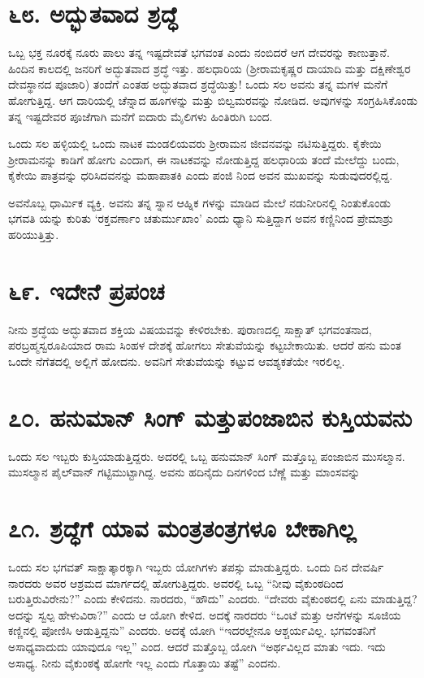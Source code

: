 \section{\num{೬೮. } ಅದ್ಭುತವಾದ ಶ್ರದ್ಧೆ}

ಒಬ್ಬ ಭಕ್ತ ನೂರಕ್ಕೆ ನೂರು ಪಾಲು ತನ್ನ ಇಷ್ಟದೇವತೆ ಭಗವಂತ ಎಂದು ನಂಬಿದರೆ ಆಗ ದೇವರನ್ನು ಕಾಣುತ್ತಾನೆ. ಹಿಂದಿನ ಕಾಲದಲ್ಲಿ ಜನರಿಗೆ ಅದ್ಭುತವಾದ ಶ್ರದ್ಧೆ ಇತ್ತು. ಹಲಧಾರಿಯ (ಶ್ರೀರಾಮಕೃಷ್ಣರ ದಾಯಾದಿ ಮತ್ತು ದಕ್ಷಿಣೇಶ್ವರ ದೇವಸ್ಥಾನದ ಪೂಜಾರಿ) ತಂದೆಗೆ ಎಂತಹ ಅದ್ಭುತವಾದ ಶ್ರದ್ಧೆಯಿತ್ತು! ಒಂದು ಸಲ ಅವನು ತನ್ನ ಮಗಳ ಮನೆಗೆ ಹೋಗುತ್ತಿದ್ದ. ಆಗ ದಾರಿಯಲ್ಲಿ ಚೆನ್ನಾದ ಹೂಗಳನ್ನು ಮತ್ತು ಬಿಲ್ವಮರವನ್ನು ನೋಡಿದ. ಅವುಗಳನ್ನು ಸಂಗ್ರಹಿಸಿಕೊಂಡು ತನ್ನ ಇಷ್ಟದೇವರ ಪೂಜೆಗಾಗಿ ಮನೆಗೆ ಐದಾರು ಮೈಲಿಗಳು ಹಿಂತಿರುಗಿ ಬಂದ.

ಒಂದು ಸಲ ಹಳ್ಳಿಯಲ್ಲಿ ಒಂದು ನಾಟಕ ಮಂಡಲಿಯವರು ಶ್ರೀರಾಮನ ಜೀವನವನ್ನು ನಟಿಸುತ್ತಿದ್ದರು. ಕೈಕೇಯಿ ಶ್ರೀರಾಮನನ್ನು ಕಾಡಿಗೆ ಹೋಗು ಎಂದಾಗ, ಈ ನಾಟಕವನ್ನು ನೋಡುತ್ತಿದ್ದ ಹಲಧಾರಿಯ ತಂದೆ ಮೇಲೆದ್ದು ಬಂದು, ಕೈಕೇಯಿ ಪಾತ್ರವನ್ನು ಧರಿಸಿದವನನ್ನು ಮಹಾಪಾತಕಿ ಎಂದು ಪಂಜಿ ನಿಂದ ಅವನ ಮುಖವನ್ನು ಸುಡುವುದರಲ್ಲಿದ್ದ.

ಅವನೊಬ್ಬ ಧಾರ್ಮಿಕ ವ್ಯಕ್ತಿ. ಅವನು ತನ್ನ ಸ್ನಾನ ಆಹ್ನಿಕ ಗಳನ್ನು ಮಾಡಿದ ಮೇಲೆ ನಡುನೀರಿನಲ್ಲಿ ನಿಂತುಕೊಂಡು ಭಗವತಿ ಯನ್ನು ಕುರಿತು ‘ರಕ್ತವರ್ಣಾಂ ಚತುರ್ಮುಖಾಂ’ ಎಂದು ಧ್ಯಾನಿ ಸುತ್ತಿದ್ದಾಗ ಅವನ ಕಣ್ಣಿನಿಂದ ಪ್ರೇಮಾಶ್ರು ಹರಿಯುತ್ತಿತ್ತು.


\section{\num{೬೯.} ಇದೇನೆ ಪ್ರಪಂಚ }

ನೀನು ಶ್ರದ್ಧೆಯ ಅದ್ಭುತವಾದ ಶಕ್ತಿಯ ವಿಷಯವನ್ನು ಕೇಳಿರಬೇಕು. ಪುರಾಣದಲ್ಲಿ ಸಾಕ್ಷಾತ್ ಭಗವಂತನಾದ, ಪರಬ್ರಹ್ಮಸ್ವರೂಪಿಯಾದ ರಾಮ ಸಿಂಹಳ ದೇಶಕ್ಕೆ ಹೋಗಲು ಸೇತುವೆಯನ್ನು ಕಟ್ಟಬೇಕಾಯಿತು. ಆದರೆ ಹನು ಮಂತ ಒಂದೇ ನೆಗೆತದಲ್ಲಿ ಅಲ್ಲಿಗೆ ಹೋದನು. ಅವನಿಗೆ ಸೇತುವೆಯನ್ನು ಕಟ್ಟುವ ಆವಶ್ಯಕತೆಯೇ ಇರಲಿಲ್ಲ.


\section{\num{೭೦.} ಹನುಮಾನ್ ಸಿಂಗ್ ಮತ್ತುಪಂಜಾಬಿನ ಕುಸ್ತಿಯವನು}

ಒಂದು ಸಲ ಇಬ್ಬರು ಕುಸ್ತಿಯಾಡುತ್ತಿದ್ದರು. ಅದರಲ್ಲಿ ಒಬ್ಬ ಹನುಮಾನ್ ಸಿಂಗ್ ಮತ್ತೊಬ್ಬ ಪಂಜಾಬಿನ ಮುಸಲ್ಮಾನ. ಮುಸಲ್ಮಾನ ಪೈಲ್​ವಾನ್ ಗಟ್ಟಿಮುಟ್ಟಾಗಿದ್ದ. ಅವನು ಹದಿನೈದು ದಿನಗಳಿಂದ ಬೆಣ್ಣೆ ಮತ್ತು ಮಾಂಸವನ್ನು



\section{\num{೭೧.} ಶ್ರದ್ಧೆಗೆ ಯಾವ ಮಂತ್ರತಂತ್ರಗಳೂ ಬೇಕಾಗಿಲ್ಲ}

ಒಂದು ಸಲ ಭಗವತ್ ಸಾಕ್ಷಾತ್ಕಾರಕ್ಕಾಗಿ ಇಬ್ಬರು ಯೋಗಿಗಳು ತಪಸ್ಸು ಮಾಡುತ್ತಿದ್ದರು. ಒಂದು ದಿನ ದೇವರ್ಷಿ ನಾರದರು ಅವರ ಆಶ್ರಮದ ಮಾರ್ಗದಲ್ಲಿ ಹೋಗುತ್ತಿದ್ದರು. ಅವರಲ್ಲಿ ಒಬ್ಬ “ನೀವು ವೈಕುಂಠದಿಂದ ಬರುತ್ತಿರುವಿರೇನು?” ಎಂದು ಕೇಳಿದನು. ನಾರದರು, “ಹೌದು” ಎಂದರು. “ದೇವರು ವೈಕುಂಠದಲ್ಲಿ ಏನು ಮಾಡುತ್ತಿದ್ದ? ಅದನ್ನು ಸ್ವಲ್ಪ ಹೇಳುವಿರಾ?” ಎಂದು ಆ ಯೋಗಿ ಕೇಳಿದ. ಅದಕ್ಕೆ ನಾರದರು “ಒಂಟೆ ಮತ್ತು ಆನೆಗಳನ್ನು ಸೂಜಿಯ ಕಣ್ಣಿನಲ್ಲಿ ಪೋಣಿಸಿ ಆಡುತ್ತಿದ್ದನು” ಎಂದರು. ಅದಕ್ಕೆ ಯೋಗಿ “ಇದರಲ್ಲೇನೂ ಆಶ್ಚರ್ಯವಿಲ್ಲ. ಭಗವಂತನಿಗೆ ಅಸಾಧ್ಯವಾದುದು ಯಾವುದೂ ಇಲ್ಲ” ಎಂದ. ಆದರೆ ಮತ್ತೊಬ್ಬ ಯೋಗಿ “ಅರ್ಥವಿಲ್ಲದ ಮಾತು ಇದು. ಇದು ಅಸಾಧ್ಯ. ನೀನು ವೈಕುಂಠಕ್ಕೆ ಹೋಗೇ ಇಲ್ಲ ಎಂದು ಗೊತ್ತಾಯಿ ತಷ್ಟೆ” ಎಂದನು.

